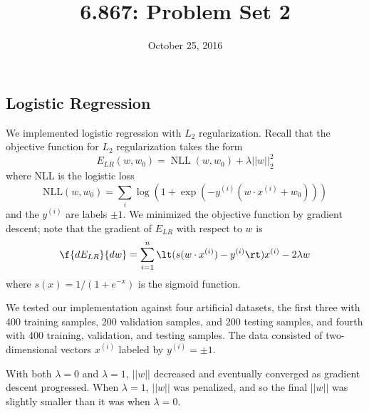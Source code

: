 \documentclass{article}
\title{6.867: Problem Set 2}
\date{October 25, 2016}
\DeclareMathOperator{\NLL}{NLL}
\newcommand{\sind}[1]{^{(#1)}}
\begin{document}
\maketitle

\begin{multicols}{2}


\section{Logistic Regression}
\label{sec:lr}

We implemented logistic regression with $L_2$ regularization.
Recall that the objective function for $L_2$ regularization takes the form
\begin{equation}
    E_{LR}(w, w_0) = \NLL(w, w_0) + \lambda ||w||_2^2
\end{equation}
where NLL is the logistic loss
\begin{equation}
    \text{NLL}(w, w_0) = \sum_i{\log(1+\exp(-y^{(i)}(w\cdot x^{(i)}+w_0)))}
\end{equation}
and the $y\sind{i}$ are labels $\pm 1$.
We minimized the objective function by gradient descent;
note that the gradient of $E_{LR}$ with respect to $w$ is
\begin{equation}
    \f{d E_{LR}}{dw} = \sum_{i=1}^n\lt(s(w\cdot x^{(i)})-y^{(i)}\rt)x^{(i)} - 2\lambda w
\end{equation}
where $s(x) = 1/(1+e^{-x})$ is the sigmoid function.

We tested our implementation against four artificial datasets,
the first three with 400 training samples,
200 validation samples,
and 200 testing samples, and fourth with 400 training, validation, and testing samples.
The data consisted of two-dimensional vectors $x\sind{i}$ labeled by $y\sind{i} = \pm1$.

With both $\lambda=0$ and $\lambda=1$,
$||w||$ decreased and eventually converged
as gradient descent progressed.
When $\lambda = 1$, $||w||$ was penalized,
and so the final $||w||$ was slightly smaller
than it was when $\lambda = 0$.


\end{multicols}
\end{document}
